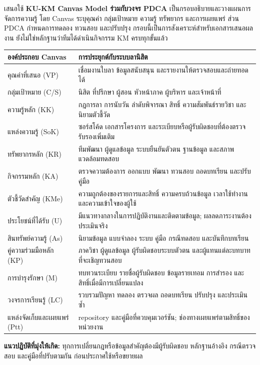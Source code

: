เสนอใช้ \textbf{KU-KM Canvas Model ร่วมกับวงจร PDCA} เป็นกรอบอธิบายและวางแผนการจัดการความรู้ โดย Canvas ระบุคุณค่า กลุ่มเป้าหมาย ความรู้ ทรัพยากร และการเผยแพร่ ส่วน PDCA กำหนดการทดลอง ทวนสอบ และปรับปรุง กรอบนี้เป็นการสังเคราะห์สำหรับเอกสารเสนอผลงาน ยังไม่ใช่หลักฐานว่าทีมได้ดำเนินกิจกรรม KM ครบทุกขั้นแล้ว

\noindent
\begin{tabularx}{\linewidth}{@{}p{43mm}X@{}}
  \toprule\rowcolor{tableheader}องค์ประกอบ Canvas & การประยุกต์กับระบบลานิสิต\\\midrule
  คุณค่าที่เสนอ (VP) & เชื่อมงานใบลา ข้อมูลสนับสนุน และรายงานให้ตรวจสอบและถ่ายทอดได้\\
  กลุ่มเป้าหมาย (C/S) & นิสิต ที่ปรึกษา ผู้สอน หัวหน้าภาค ผู้บริหาร และเจ้าหน้าที่\\
  ความรู้หลัก (KK) & กฎการลา การนับวัน ลำดับพิจารณา สิทธิ์ ความสัมพันธ์รายวิชา และนิยามตัวชี้วัด\\
  แหล่งความรู้ (SoK) & ซอร์สโค้ด เอกสารโครงการ และระเบียบหรือผู้รับผิดชอบที่ต้องตรวจรับรองเพิ่มเติม\\
  ทรัพยากรหลัก (KR) & ทีมพัฒนา ผู้ดูแลข้อมูล ระบบยืนยันตัวตน ฐานข้อมูล และสภาพแวดล้อมทดสอบ\\
  กิจกรรมหลัก (KA) & ตรวจความต้องการ ออกแบบ พัฒนา ทวนสอบ ถอดบทเรียน และปรับคู่มือ\\
  ตัวชี้วัดสำคัญ (KMe) & ความถูกต้องของรายการและสิทธิ์ ความครบถ้วนข้อมูล เวลาใช้ทำงาน และความเข้าใจของผู้ใช้\\
  ประโยชน์ที่ได้รับ (U) & มีแนวทางกลางในการปฏิบัติงานและติดตามข้อมูล; ผลลดภาระงานต้องประเมินจริง\\
  สินทรัพย์ความรู้ (As) & นิยามข้อมูล แบบจำลอง ระบบ คู่มือ กรณีทดสอบ และบันทึกบทเรียน\\
  คู่ความร่วมมือหลัก (KP) & ภาควิชา ผู้ดูแลข้อมูล ผู้รับผิดชอบระบบตัวตน และผู้แทนแต่ละบทบาทที่จะเชิญทวนสอบ\\
  การบำรุงรักษา (M) & ทบทวนระเบียบ รายชื่อผู้รับผิดชอบ ข้อมูลรายเทอม การสำรอง และสิทธิ์เมื่อมีการเปลี่ยนแปลง\\
  วงจรการเรียนรู้ (LC) & รวบรวมปัญหา ทดลอง ตรวจผล ถอดบทเรียน ปรับปรุง และประเมินซ้ำ\\
  แหล่งจัดเก็บและเผยแพร่ (Ptt) & repository และคู่มือที่ควบคุมเวอร์ชัน; ช่องทางเผยแพร่ตามสิทธิ์ของหน่วยงาน\\\bottomrule
\end{tabularx}

\noindent\textbf{แนวปฏิบัติที่มุ่งให้เกิด:} ทุกการเปลี่ยนกฎหรือข้อมูลสำคัญต้องมีผู้รับผิดชอบ หลักฐานอ้างอิง กรณีตรวจสอบ และคู่มือที่ปรับตามกัน ก่อนประกาศใช้หรือขยายผล
